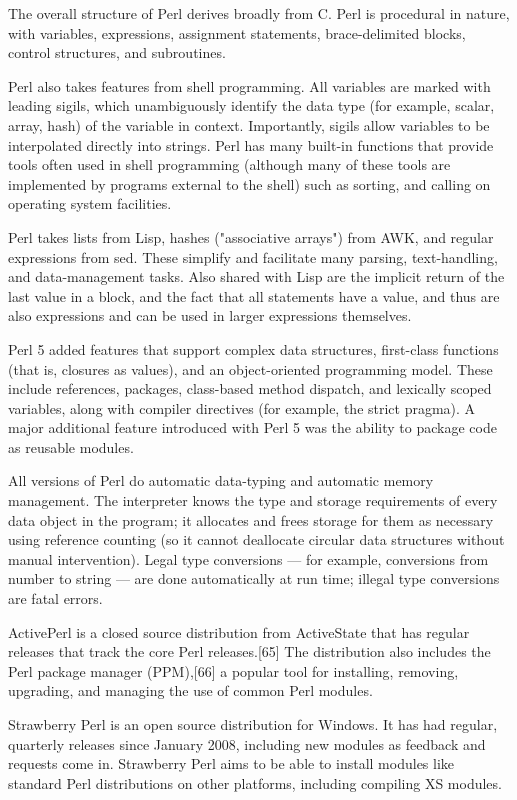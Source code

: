 \vpara
The overall structure of Perl derives broadly from C. Perl is procedural in nature, with variables, expressions, assignment statements, brace-delimited blocks, control structures, and subroutines.

\vpara
Perl also takes features from shell programming. All variables are marked with leading sigils, which unambiguously identify the data type (for example, scalar, array, hash) of the variable in context. Importantly, sigils allow variables to be interpolated directly into strings. Perl has many built-in functions that provide tools often used in shell programming (although many of these tools are implemented by programs external to the shell) such as sorting, and calling on operating system facilities.

\vpara
Perl takes lists from Lisp, hashes ("associative arrays") from AWK, and regular expressions from sed. These simplify and facilitate many parsing, text-handling, and data-management tasks. Also shared with Lisp are the implicit return of the last value in a block, and the fact that all statements have a value, and thus are also expressions and can be used in larger expressions themselves.

\vpara
Perl 5 added features that support complex data structures, first-class functions (that is, closures as values), and an object-oriented programming model. These include references, packages, class-based method dispatch, and lexically scoped variables, along with compiler directives (for example, the strict pragma). A major additional feature introduced with Perl 5 was the ability to package code as reusable modules. 

\vpara
All versions of Perl do automatic data-typing and automatic memory management. The interpreter knows the type and storage requirements of every data object in the program; it allocates and frees storage for them as necessary using reference counting (so it cannot deallocate circular data structures without manual intervention). Legal type conversions — for example, conversions from number to string — are done automatically at run time; illegal type conversions are fatal errors.

\vpara
ActivePerl is a closed source distribution from ActiveState that has regular releases that track the core Perl releases.[65] The distribution also includes the Perl package manager (PPM),[66] a popular tool for installing, removing, upgrading, and managing the use of common Perl modules.

\vpara
Strawberry Perl is an open source distribution for Windows. It has had regular, quarterly releases since January 2008, including new modules as feedback and requests come in. Strawberry Perl aims to be able to install modules like standard Perl distributions on other platforms, including compiling XS modules.

